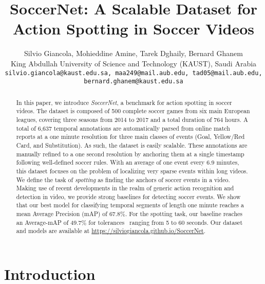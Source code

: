 \documentclass[10pt,twocolumn,letterpaper]{article}
\begin{document}
\title{SoccerNet: A Scalable Dataset for Action Spotting in Soccer Videos}

\author{Silvio Giancola, Mohieddine Amine, Tarek Dghaily, Bernard Ghanem\\
King Abdullah University of Science and Technology (KAUST), Saudi Arabia\\
{\tt\small silvio.giancola@kaust.edu.sa, maa249@mail.aub.edu, tad05@mail.aub.edu, bernard.ghanem@kaust.edu.sa}
}

\maketitle



\begin{abstract}

In this paper, we introduce \emph{SoccerNet}, a benchmark for action spotting in soccer videos. 
The dataset is composed of 500 complete soccer games from six main European leagues, covering three seasons from 2014 to 2017 and a total duration of 764 hours.
A total of 6,637 temporal annotations are automatically parsed from online match reports at a one minute resolution for three main classes of events (Goal, Yellow/Red Card, and Substitution). 
As such, the dataset is easily scalable.
These annotations are manually refined to a one second resolution by anchoring them at a single timestamp following well-defined soccer rules.
With an average of one event every 6.9 minutes, this dataset focuses on the problem of localizing very sparse events within long videos.
We define the task of \emph{spotting} as finding the anchors of soccer events in a video.
Making use of recent developments in the realm of generic action recognition and detection in video, we provide strong baselines for detecting soccer events.
We show that our best model for classifying temporal segments of length one minute reaches a mean Average Precision (mAP) of 67.8\%.
For the spotting task, our baseline reaches an Average-mAP of 49.7\% for tolerances~ ranging from 5 to 60 seconds.
Our dataset and models are available at \href{https://silviogiancola.github.io/SoccerNet}{https://silviogiancola.github.io/SoccerNet}.

\end{abstract}

 
\vspace{-8pt}
\section{Introduction}
\vspace{-2pt}
\end{document}
